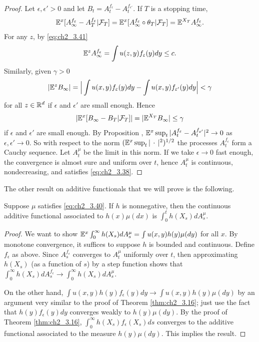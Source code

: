 \begin{proof}
Let $\epsilon,\epsilon' > 0$ and let $B_t = A_t^{f_\epsilon} - A_t^{f_{\epsilon'}}$. If $T$ is a stopping time,
\[
    \mathbb{E}^x[A_\infty^{f_\varepsilon} - A_T^{f_\varepsilon}| \mathcal{F}_T] = \mathbb{E}^x[A_\infty^{f_\varepsilon} \circ \theta_T| \mathcal{F}_T] = \mathbb{E}^{X_T}A_\infty^{f_\varepsilon}.
\]
For any $z$, by \eqref{eq:ch2_3.41}
\[
    \mathbb{E}^zA_\infty^{f_\varepsilon} = \int u(z,y)f_\varepsilon(y)dy \leq c.
\]
Similarly, given $\gamma > 0$
\[
    |\mathbb{E}^zB_\infty| = \Big|\int u(x,y)f_\varepsilon(y)dy - \int u(x,y)f_{\varepsilon'}(y)dy\Big| < \gamma
\]
for all $z \in \mathbb{R}^d$ if $\epsilon$ and $\epsilon'$ are small enough. Hence
\[
    |\mathbb{E}^x[B_\infty - B_T| \mathcal{F}_T]| = |\mathbb{E}^{X_T}B_\infty| \leq \gamma
\]
if $\epsilon$ and $\epsilon'$ are small enough. By Proposition , $\mathbb{E}^x\sup_t|A_t^{f_\varepsilon}-A_t^{f_{\varepsilon'}}|^2 \to 0$ as $\epsilon,\epsilon' \to 0$. So with respect to the norm $(\mathbb{E}^x\sup_t|\,\cdot\,|^2)^{1/2}$ the processes $A_t^{f_\epsilon}$ form a Cauchy sequence. Let $A_t^\mu$ be the limit in this norm. If we take $\epsilon \to 0$ fast enough, the convergence is almost sure and uniform over $t$, hence $A_t^\mu$ is continuous, nondecreasing, and satisfies \eqref{eq:ch2_3.38}.
\end{proof}

The other result on additive functionals that we will prove is the following.

\begin{proposition}\label{prop:ch2_3.17}
Suppose $\mu$ satisfies \eqref{eq:ch2_3.40}. If $h$ is nonnegative, then the continuous additive functional associated to $h(x)\mu(dx)$ is $\int_0^t h(X_s)dA_s^\mu$.
\end{proposition}

\begin{proof}
We want to show $\mathbb{E}^x\int_0^\infty h(X_s)dA_s^\mu = \int u(x,y)h(y)\mu(dy)$ for all $x$. By monotone convergence, it suffices to suppose $h$ is bounded and continuous. Define $f_\epsilon$ as above. Since $A_s^{f_\epsilon}$ converges to $A_t^\mu$ uniformly over $t$, then approximating $h(X_s)$ (as a function of $s$) by a step function shows that $\int_0^\infty h(X_s)dA_s^{f_\epsilon} \to \int_0^\infty h(X_s)dA_s^\mu$.

On the other hand, $\int u(x,y)h(y)f_\epsilon(y)dy \to \int u(x,y)h(y)\mu(dy)$ by an argument very similar to the proof of Theorem \ref{thm:ch2_3.16}; just use the fact that $h(y)f_\epsilon(y)dy$ converges weakly to $h(y)\mu(dy)$. By the proof of Theorem \ref{thm:ch2_3.16}, $\int_0^\infty h(X_s)f_\epsilon(X_s)ds$ converges to the additive functional associated to the measure $h(y)\mu(dy)$. This implies the result.
\end{proof}

